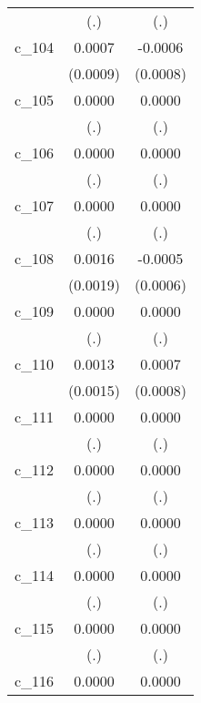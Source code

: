 {\begin{tabular}{l*{2}{c}}
            &         (.)        &         (.)        \\
[1em]
c\_104       &      0.0007        &     -0.0006        \\
            &    (0.0009)        &    (0.0008)        \\
[1em]
c\_105       &      0.0000        &      0.0000        \\
            &         (.)        &         (.)        \\
[1em]
c\_106       &      0.0000        &      0.0000        \\
            &         (.)        &         (.)        \\
[1em]
c\_107       &      0.0000        &      0.0000        \\
            &         (.)        &         (.)        \\
[1em]
c\_108       &      0.0016        &     -0.0005        \\
            &    (0.0019)        &    (0.0006)        \\
[1em]
c\_109       &      0.0000        &      0.0000        \\
            &         (.)        &         (.)        \\
[1em]
c\_110       &      0.0013        &      0.0007        \\
            &    (0.0015)        &    (0.0008)        \\
[1em]
c\_111       &      0.0000        &      0.0000        \\
            &         (.)        &         (.)        \\
[1em]
c\_112       &      0.0000        &      0.0000        \\
            &         (.)        &         (.)        \\
[1em]
c\_113       &      0.0000        &      0.0000        \\
            &         (.)        &         (.)        \\
[1em]
c\_114       &      0.0000        &      0.0000        \\
            &         (.)        &         (.)        \\
[1em]
c\_115       &      0.0000        &      0.0000        \\
            &         (.)        &         (.)        \\
[1em]
c\_116       &      0.0000        &      0.0000        \\

\end{tabular}}
